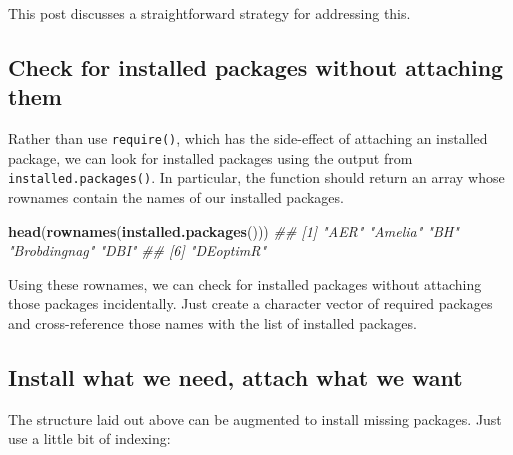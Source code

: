 \documentclass[]{article}
\newenvironment{Shaded}{\begin{snugshade}}{\end{snugshade}}
\newcommand{\CommentTok}[1]{\textcolor[rgb]{0.56,0.35,0.01}{\textit{#1}}}
\newcommand{\KeywordTok}[1]{\textcolor[rgb]{0.13,0.29,0.53}{\textbf{#1}}}
\newcommand{\NormalTok}[1]{#1}
\newcommand{\OperatorTok}[1]{\textcolor[rgb]{0.81,0.36,0.00}{\textbf{#1}}}
\newcommand{\StringTok}[1]{\textcolor[rgb]{0.31,0.60,0.02}{#1}}
\theoremstyle{definition}
\theoremstyle{definition}
\theoremstyle{definition}
\theoremstyle{remark}
\begin{document}
This post discusses a straightforward strategy for addressing this.

\hypertarget{check-for-installed-packages-without-attaching-them}{%
\subsection{Check for installed packages without attaching
them}\label{check-for-installed-packages-without-attaching-them}}

Rather than use \texttt{require()}, which has the side-effect of
attaching an installed package, we can look for installed packages using
the output from \texttt{installed.packages()}. In particular, the
function should return an array whose rownames contain the names of our
installed packages.

\begin{Shaded}
\begin{Highlighting}[]
\KeywordTok{head}\NormalTok{(}\KeywordTok{rownames}\NormalTok{(}\KeywordTok{installed.packages}\NormalTok{()))}
\CommentTok{## [1] "AER"         "Amelia"      "BH"          "Brobdingnag" "DBI"        }
\CommentTok{## [6] "DEoptimR"}
\end{Highlighting}
\end{Shaded}

Using these rownames, we can check for installed packages without
attaching those packages incidentally. Just create a character vector of
required packages and cross-reference those names with the list of
installed packages.

\begin{Shaded}
\end{Shaded}

\hypertarget{install-what-we-need-attach-what-we-want}{%
\subsection{Install what we need, attach what we
want}\label{install-what-we-need-attach-what-we-want}}

The structure laid out above can be augmented to install missing
packages. Just use a little bit of indexing:
\end{document}
